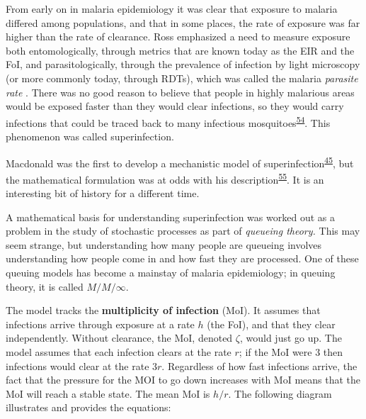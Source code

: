 \documentclass[
]{book}
\begin{document}
From early on in malaria epidemiology it was clear that exposure to malaria differed among populations, and that in some places, the rate of exposure was far higher than the rate of clearance. Ross emphasized a need to measure exposure both entomologically, through metrics that are known today as the EIR and the FoI, and parasitologically, through the prevalence of infection by light microscopy (or more commonly today, through RDTs), which was called the malaria \emph{parasite rate} . There was no good reason to believe that people in highly malarious areas would be exposed faster than they would clear infections, so they would carry infections that could be traced back to many infectious mosquitoes\textsuperscript{\protect\hyperlink{ref-WaltonGA1947ControlMalaria}{54}}. This phenomenon was called superinfection.

Macdonald was the first to develop a mechanistic model of superinfection\textsuperscript{\protect\hyperlink{ref-MacdonaldG1950Superinfection}{45}}, but the mathematical formulation was at odds with his description\textsuperscript{\protect\hyperlink{ref-FinePEM1975SuperinfectionProblem}{55}}. It is an interesting bit of history for a different time.

A mathematical basis for understanding superinfection was worked out as a problem in the study of stochastic processes as part of \emph{queueing theory.} This may seem strange, but understanding how many people are queueing involves understanding how people come in and how fast they are processed. One of these queuing models has become a mainstay of malaria epidemiology; in queuing theory, it is called \(M/M/\infty\).

The model tracks the \textbf{multiplicity of infection} (MoI). It assumes that infections arrive through exposure at a rate \(h\) (the FoI), and that they clear independently. Without clearance, the MoI, denoted \(\zeta\), would just go up. The model assumes that each infection clears at the rate \(r\); if the MoI were \(3\) then infections would clear at the rate \(3r\). Regardless of how fast infections arrive, the fact that the pressure for the MOI to go down increases with MoI means that the MoI will reach a stable state. The mean MoI is \(h/r.\) The following diagram illustrates and provides the equations:
\end{document}
